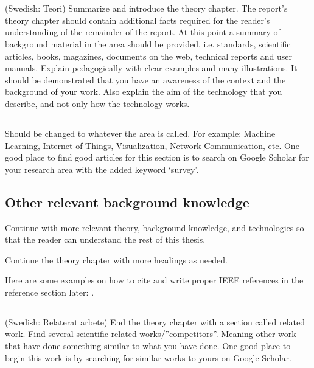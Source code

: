 \section{}\label{sec:theory} 
(Swedish: Teori) Summarize and introduce the theory chapter. The report’s theory chapter should contain additional facts required for the reader's understanding of the remainder of the report. At this point a summary of background material in the area should be provided, i.e. standards, scientific articles, books, magazines, documents on the web, technical reports and user manuals. Explain pedagogically with clear examples and many illustrations. It should be demonstrated that you have an awareness of the context and the background of your work. Also explain the aim of the technology that you describe, and not only how the technology works.

\subsection{}
Should be changed to whatever the area is called. For example: Machine Learning, Internet-of-Things, Visualization, Network Communication, etc. One good place to find good articles for this section is to search on Google Scholar for your research area with the added keyword ‘survey’.

\subsection{Other relevant background knowledge}
Continue with more relevant theory, background knowledge, and technologies so that the reader can understand the rest of this thesis.

Continue the theory chapter with more headings as needed.

Here are some examples on how to cite and write proper IEEE references in the reference section later: \cite{attapangittya2003social, smith2004adaptive, hayes2007operations, wilson2023computers, kawasaki1993parametric}.

\subsection{}
(Swedish: Relaterat arbete) End the theory chapter with a section called related work. Find several scientific related works/”competitors”. Meaning other work that have done something similar to what you have done. One good place to begin this work is by searching for similar works to yours on Google Scholar.

